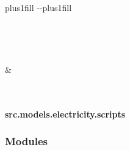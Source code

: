 \documentclass[letterpaper,10pt,english]{sphinxmanual}
\begin{document}
\begin{savenotes}
\sphinxatlongtablestart
\sphinxthistablewithglobalstyle
\sphinxthistablewithnovlinesstyle
\makeatletter
  \LTleft \@totalleftmargin plus1fill
  \LTright\dimexpr\columnwidth-\@totalleftmargin-\linewidth\relax plus1fill
\makeatother
\begin{longtable}{}
\sphinxtoprule
\endfirsthead

\\
\sphinxtoprule
\endhead

\sphinxbottomrule
{}\\
\endfoot

\endlastfoot
\sphinxtableatstartofbodyhook

\sphinxAtStartPar
{\hyperref[\detokenize{src.models.electricity.scripts:module-src.models.electricity.scripts}]{}}
&
\sphinxAtStartPar

\\
\sphinxbottomrule
\end{longtable}
\sphinxtableafterendhook
\sphinxatlongtableend
\end{savenotes}

\sphinxstepscope


\paragraph{src.models.electricity.scripts}
\label{\detokenize{src.models.electricity.scripts:module-src.models.electricity.scripts}}\label{\detokenize{src.models.electricity.scripts:src-models-electricity-scripts}}\label{\detokenize{src.models.electricity.scripts::doc}}\subsubsection*{Modules}
\end{document}
